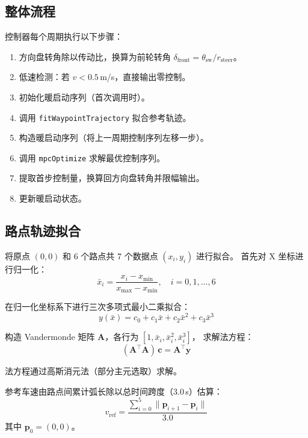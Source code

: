 \documentclass[a4paper,10pt]{article}
\begin{document}
\subsection{整体流程}

控制器每个周期执行以下步骤：
\begin{enumerate}
  \item 方向盘转角除以传动比，换算为前轮转角 $\delta_{\text{front}} = \theta_{\text{sw}} / r_{\text{steer}}$。
  \item 低速检测：若 $v < 0.5$\,m/s，直接输出零控制。
  \item 初始化暖启动序列（首次调用时）。
  \item 调用 \texttt{fitWaypointTrajectory} 拟合参考轨迹。
  \item 构造暖启动序列（将上一周期控制序列左移一步）。
  \item 调用 \texttt{mpcOptimize} 求解最优控制序列。
  \item 提取首步控制量，换算回方向盘转角并限幅输出。
  \item 更新暖启动状态。
\end{enumerate}

\subsection{路点轨迹拟合}

将原点 $(0,0)$ 和 6 个路点共 7 个数据点 $(x_i, y_i)$ 进行拟合。
首先对 X 坐标进行归一化：
\begin{equation}
  \bar{x}_i = \frac{x_i - x_{\min}}{x_{\max} - x_{\min}}, \quad i = 0, 1, \ldots, 6
\end{equation}

在归一化坐标系下进行三次多项式最小二乘拟合：
\begin{equation}
  y(\bar{x}) = c_0 + c_1 \bar{x} + c_2 \bar{x}^2 + c_3 \bar{x}^3
\end{equation}

构造 Vandermonde 矩阵 $\mathbf{A}$，各行为 $[1, \bar{x}_i, \bar{x}_i^2, \bar{x}_i^3]$，
求解法方程：
\begin{equation}
  (\mathbf{A}^{\!\top}\!\mathbf{A})\,\mathbf{c} = \mathbf{A}^{\!\top}\!\mathbf{y}
\end{equation}

法方程通过高斯消元法（部分主元选取）求解。

参考车速由路点间累计弧长除以总时间跨度（3.0\,s）估算：
\begin{equation}
  v_{\text{ref}} = \frac{\sum_{i=0}^{5} \|\mathbf{p}_{i+1} - \mathbf{p}_i\|}{3.0}
\end{equation}
其中 $\mathbf{p}_0 = (0,0)$。
\end{document}
